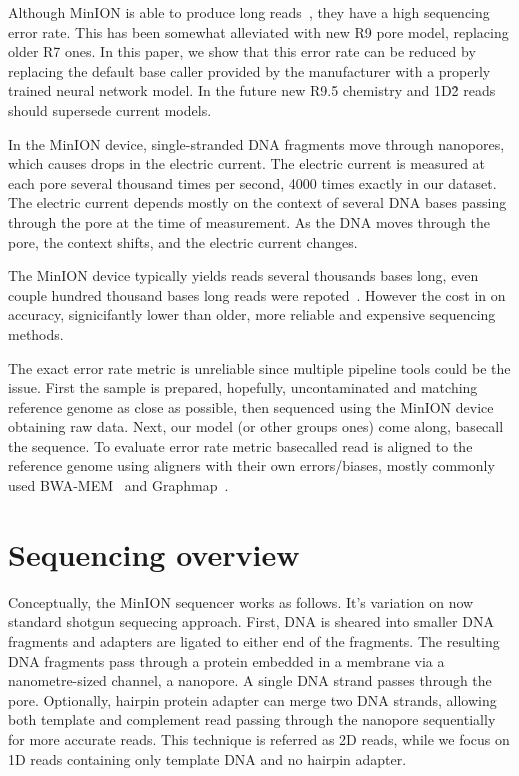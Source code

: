 \documentclass[runningheads,a4paper]{llncs}
\begin{document}
Although MinION is able to produce long reads~\cite{loman1-100k,loman2-800k}, they have a high sequencing error rate. This has been somewhat alleviated with new R9 pore model, replacing older R7 ones. In this paper, we show that this error rate can be reduced by replacing the default base caller provided by the manufacturer with a properly trained neural network model. In the future new R9.5 chemistry and 1D\^2 reads should supersede current models.

In the MinION device, single-stranded DNA fragments move through nanopores, which causes drops in the electric current. The electric current is measured at each pore several thousand times per second, 4000 times exactly in our dataset. The electric current depends mostly on the context of several DNA bases passing through the pore at the time of measurement. As the DNA moves through the pore, the context shifts, and the electric current changes.

The MinION device typically yields reads several thousands bases long, even couple hundred thousand bases long reads were repoted~\cite{loman1-100k,loman2-800k}. However the cost in on accuracy, signicifantly lower than older, more reliable and expensive sequencing methods.

The exact error rate metric is unreliable since multiple pipeline tools could be the issue. First the sample is prepared, hopefully, uncontaminated and matching reference genome as close as possible, then sequenced using the MinION device obtaining raw data. Next, our model (or other groups ones) come along, basecall the sequence. To evaluate error rate metric basecalled read is aligned to the reference genome using aligners with their own errors/biases, mostly commonly used BWA-MEM~\cite{li2013aligning} and Graphmap~\cite{sovic2016fast}.

\section{Sequencing overview}
Conceptually, the MinION sequencer works as follows. It's variation on now standard shotgun sequecing approach. First, DNA is sheared into smaller DNA fragments and adapters are ligated to either end of the fragments. The resulting DNA fragments pass through a protein embedded in a membrane via a nanometre-sized channel, a nanopore. A single DNA strand passes through the pore. Optionally, hairpin protein adapter can merge two DNA strands, allowing both template and complement read passing through the nanopore sequentially for more accurate reads. This technique is referred as 2D reads, while we focus on 1D reads containing only template DNA and no hairpin adapter.
\end{document}
